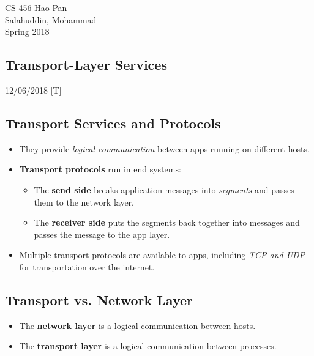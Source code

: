 \documentclass{article}
\begin{document}
\noindent
{CS 456 \hfill Hao Pan}\\
{Salahuddin, Mohammad}\\
{Spring 2018}


\begin{center}
\section{Transport-Layer Services}
\noindent
{\hfill 12/06/2018 [T]}
\end{center}

\subsection{Transport Services and Protocols}

\begin{itemize}
\item They provide \emph{logical communication} between apps running on different hosts.
\item {\bf Transport protocols} run in end systems:
\begin{itemize}
\item The {\bf send side} breaks application messages into \emph{segments} and passes them to the network layer.
\item The {\bf receiver side} puts the segments back together into messages and passes the message to the app layer.
\end{itemize}
\item Multiple transport protocols are available to apps, including \emph{TCP and UDP} for transportation over the internet.
\end{itemize}

\subsection{Transport vs. Network Layer}

\begin{itemize}
\item The {\bf network layer} is a logical communication between hosts.
\item The {\bf transport layer} is a logical communication between processes.
\end{itemize}
\end{document}
